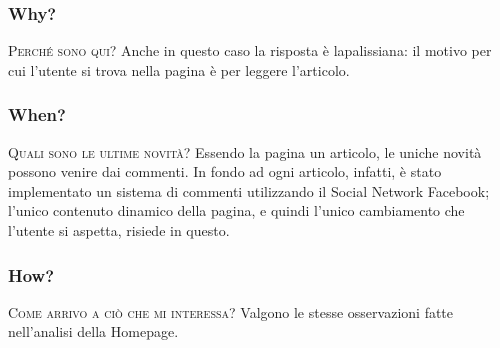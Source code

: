 \subsubsection{Why?}
\textsc{Perché sono qui?} Anche in questo caso la risposta è lapalissiana: il motivo per cui l'utente si trova nella pagina è per leggere l'articolo.

\subsubsection{When?}
\textsc{Quali sono le ultime novità?} Essendo la pagina un articolo, le uniche novità possono venire dai commenti. In fondo ad ogni articolo, infatti, è stato implementato un sistema di commenti utilizzando il Social Network Facebook; l'unico contenuto dinamico della pagina, e quindi l'unico cambiamento che l'utente si aspetta, risiede in questo.

\subsubsection{How?}
\textsc{Come arrivo a ciò che mi interessa?} Valgono le stesse osservazioni fatte nell'analisi della Homepage.
